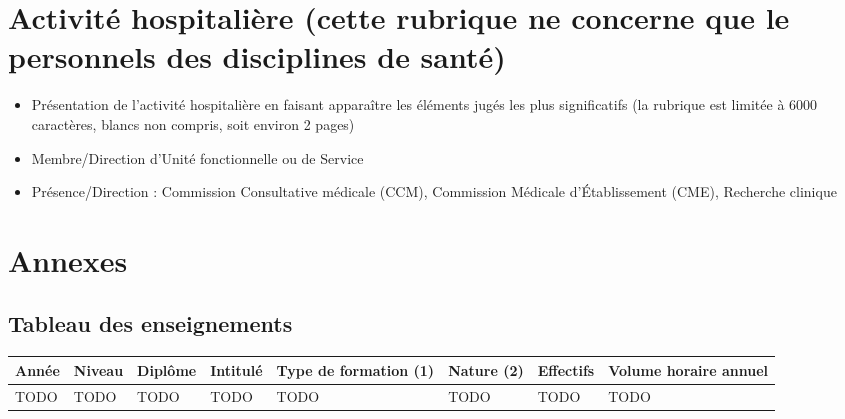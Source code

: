 \documentclass[a4paper,12pt]{article}
\newcommand{\ligneSeparatrice}{\noindent{\color{black!40}\rule{\textwidth}{2pt}}}
\newcommand{\instructions}[1]{{\color{black}#1}}
\begin{document}
\ligneSeparatrice{}


\section{Activité hospitalière (cette rubrique ne concerne que le personnels des disciplines de santé)}


\instructions{%
	{\em
	\begin{itemize}
		\item Présentation de l'activité hospitalière en faisant apparaître les éléments jugés les plus significatifs (la rubrique est limitée à 6000 caractères, blancs non compris, soit environ 2 pages)
		\item Membre/Direction d'Unité fonctionnelle ou de Service
    	\item Présence/Direction : Commission Consultative médicale (CCM), Commission Médicale d'Établissement (CME), Recherche clinique
	\end{itemize}

	}
}




\ligneSeparatrice{}


\newpage
\appendix

\section{Annexes}


\subsection{Tableau des enseignements}


{\centering
\setlength{\tabcolsep}{2pt} %
\begin{tabular}{| l | l | l | l | l | l | l | l |}
	\hline
	Année & Niveau & Diplôme & Intitulé & Type de formation (1) & Nature (2) & Effectifs & Volume horaire annuel \\
	\hline
	TODO & TODO & TODO & TODO & TODO & TODO & TODO & TODO \\
	\hline
\end{tabular}

}
\end{document}

